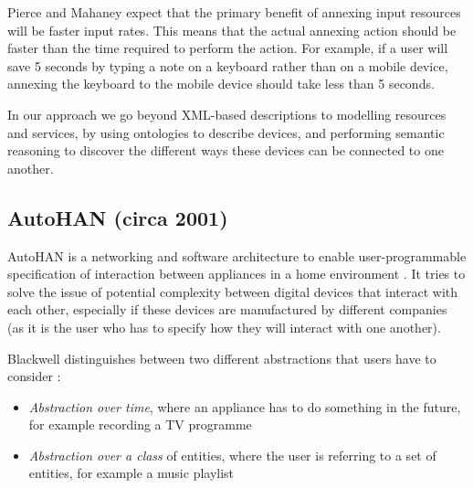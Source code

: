 
Pierce and Mahaney expect that the primary benefit of annexing input resources will be faster input rates. This means that the actual annexing action should be faster than the time required to perform the action. For example, if a user will save 5 seconds by typing a note on a keyboard rather than on a mobile device, annexing the keyboard to the mobile device should take less than 5 seconds.

In our approach we go beyond \ac{XML}-based descriptions to modelling resources and services, by using ontologies to describe devices, and performing semantic reasoning to discover the different ways these devices can be connected to one another. 

\subsection{AutoHAN (circa 2001)}
\label{autohan}

AutoHAN is a networking and software architecture to enable user-programmable specification of interaction between appliances in a home environment \cite{Blackwell2001}. It tries to solve the issue of potential complexity between digital devices that interact with each other, especially if these devices are manufactured by different companies (as it is the user who has to specify how they will interact with one another).

Blackwell distinguishes between two different abstractions that users have to consider  \cite{Blackwell2001}:
\begin{itemize}
	\item \emph{Abstraction over time}, where an appliance has to do something in the future, for example recording a TV programme
	\item \emph{Abstraction over a class} of entities, where the user is referring to a set of entities, for example a music playlist
\end{itemize}


